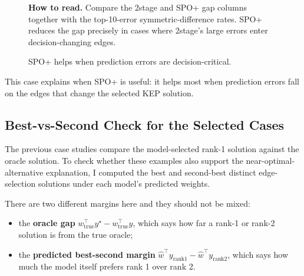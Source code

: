 \documentclass[11pt]{article}
\newcommand{\howtoread}[1]{%
  \par\smallskip
  \noindent\textbf{How to read.} #1%
}
\begin{document}
\begin{figure}[H]
\centering
\small
{}
\caption{SPO+ helps when prediction errors are decision-critical.}
\label{fig:case-c}
\howtoread{Compare the 2stage and SPO+ gap columns together with the top-10-error symmetric-difference rates. SPO+ reduces the gap precisely in cases where 2stage's large errors enter decision-changing edges.}
\end{figure}

This case explains when SPO+ is useful: it helps most when prediction errors
fall on the edges that change the selected KEP solution.

\subsection{Best-vs-Second Check for the Selected Cases}
The previous case studies compare the model-selected rank-1 solution against
the oracle solution. To check whether these examples also support the
near-optimal-alternative explanation, I computed the best and second-best
distinct edge-selection solutions under each model's predicted weights.

There are two different margins here and they should not be mixed:

\begin{itemize}
    \item the \textbf{oracle gap}
    $w_{\mathrm{true}}^\top y^\star - w_{\mathrm{true}}^\top y$, which says
    how far a rank-1 or rank-2 solution is from the true oracle;
    \item the \textbf{predicted best-second margin}
    $\hat w^\top y_{\mathrm{rank1}}-\hat w^\top y_{\mathrm{rank2}}$, which
    says how much the model itself prefers rank 1 over rank 2.
\end{itemize}
\end{document}
